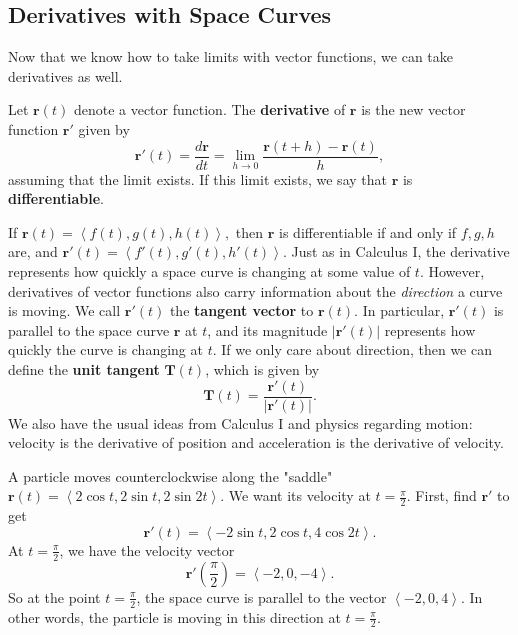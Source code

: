 \documentclass[10pt,]{book}
\newcommand{\terminology}[1]{\textbf{#1}}
\theoremstyle{ptxplainnotitle}
\theoremstyle{ptxplaintitle}
\theoremstyle{ptxplainnotitle}
\theoremstyle{ptxplaintitle}
\theoremstyle{ptxplainnotitle}
\theoremstyle{ptxplaintitle}
\theoremstyle{ptxdefinitionnotitle}
\theoremstyle{ptxdefinitiontitle}
\theoremstyle{ptxdefinitionnotitle}
\theoremstyle{ptxdefinitiontitle}
\theoremstyle{ptxdefinitionnotitle}
\theoremstyle{ptxdefinitiontitle}
\theoremstyle{ptxdefinitionnotitle}
\theoremstyle{ptxdefinitiontitle}
\theoremstyle{ptxdefinitionnotitle}
\theoremstyle{ptxdefinitiontitle}
\numberwithin{equation}{section}
\newcommand{\vv}[1]{\mathbf{#1}}
\newcommand{\dotprod}[1]{\left\langle #1 \right\rangle}
\begin{document}
\subsection[{Derivatives with Space Curves}]{Derivatives with Space Curves}\label{subsection-derivatives-with-space-curves}
\hypertarget{p-919}{}%
Now that we know how to take limits with vector functions, we can take derivatives as well.%
\begin{definition}\label{definition-derivatives-of-vector-functions}
\hypertarget{p-920}{}%
Let \(\vv{r}(t)\) denote a vector function. The \terminology{derivative} of \(\vv{r}\) is the new vector function \(\vv{r}'\) given by%
%
\begin{equation*}
\vv{r}'(t) = \frac{d\vv{r}}{dt} = \lim_{h\to0}\frac{\vv{r}(t+h)-\vv{r}(t)}{h},
\end{equation*}
\hypertarget{p-921}{}%
assuming that the limit exists. If this limit exists, we say that \(\vv{r}\) is \terminology{differentiable}.%
\end{definition}
\hypertarget{p-922}{}%
If \(\vv{r}(t) = \dotprod{f(t),g(t),h(t)},\) then \(\vv{r}\) is differentiable if and only if \(f,g,h\) are, and \(\vv{r}'(t) = \dotprod{f'(t),g'(t),h'(t)}.\) Just as in Calculus I, the derivative represents how quickly a space curve is changing at some value of \(t\). However, derivatives of vector functions also carry information about the \emph{direction} a curve is moving. We call \(\vv{r}'(t)\) the \terminology{tangent vector} to \(\vv{r}(t)\). In particular, \(\vv{r}'(t)\) is parallel to the space curve \(\vv{r}\) at \(t\), and its magnitude \(|\vv{r}'(t)|\) represents how quickly the curve is changing at \(t\). If we only care about direction, then we can define the \terminology{unit tangent} \(\vv{T}(t)\), which is given by%
%
\begin{equation*}
\vv{T}(t) = \frac{\vv{r}'(t)}{|\vv{r}'(t)|}.
\end{equation*}
\hypertarget{p-923}{}%
We also have the usual ideas from Calculus I and physics regarding motion: velocity is the derivative of position and acceleration is the derivative of velocity.%
\begin{example}\label{example-velocity-on-a-saddle}
\hypertarget{p-924}{}%
A particle moves counterclockwise along the "saddle" \(\vv{r}(t) = \dotprod{2\cos t, 2\sin t, 2\sin 2t}\). We want its velocity at \(t=\frac{\pi}{2}\). First, find \(\vv{r}'\) to get%
%
\begin{equation*}
\vv{r}'(t) = \dotprod{-2\sin t,2\cos t,4\cos2t}.
\end{equation*}
\hypertarget{p-925}{}%
At \(t=\frac{\pi}{2}\), we have the velocity vector%
%
\begin{equation*}
\vv{r}'\left(\frac{\pi}{2}\right) = \dotprod{-2,0,-4}.
\end{equation*}
\hypertarget{p-926}{}%
So at the point \(t=\frac{\pi}{2}\), the space curve is parallel to the vector \(\dotprod{-2,0,4}\). In other words, the particle is moving in this direction at \(t=\frac{\pi}{2}\).%
\end{example}
\end{document}

